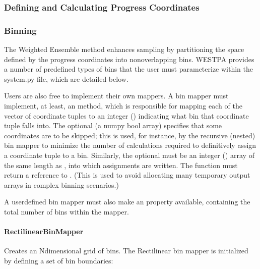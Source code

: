 \documentclass[letterpaper,10pt,english]{sphinxmanual}
\begin{document}
\subsubsection{Defining and Calculating Progress Coordinates}
\label{\detokenize{users_guide/west/setup:defining-and-calculating-progress-coordinates}}

\subsubsection{Binning}
\label{\detokenize{users_guide/west/setup:binning}}
The Weighted Ensemble method enhances sampling by partitioning the space
defined by the progress coordinates into non\sphinxhyphen{}overlapping bins. WESTPA provides
a number of pre\sphinxhyphen{}defined types of bins that the user must parameterize within
the system.py file, which are detailed below.

Users are also free to implement their own mappers. A bin mapper must
implement, at least, an  method,
which is responsible for mapping each of the vector of coordinate tuples
 to an integer () indicating what bin that coordinate
tuple falls into. The optional  (a numpy bool array) specifies that
some coordinates are to be skipped; this is used, for instance, by the
recursive (nested) bin mapper to minimize the number of calculations required
to definitively assign a coordinate tuple to a bin. Similarly, the optional
 must be an integer () array of the same length as
, into which assignments are written. The  function must
return a reference to . (This is used to avoid allocating many
temporary output arrays in complex binning scenarios.)

A user\sphinxhyphen{}defined bin mapper must also make an  property available,
containing the total number of bins within the mapper.


\paragraph{RectilinearBinMapper}
\label{\detokenize{users_guide/west/setup:rectilinearbinmapper}}
Creates an N\sphinxhyphen{}dimensional grid of bins. The Rectilinear bin mapper is
initialized by defining a set of bin boundaries:
\end{document}
